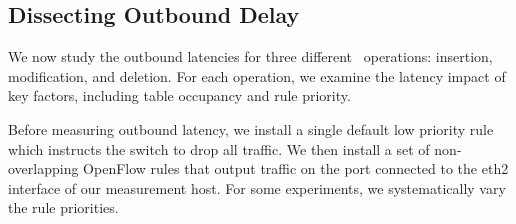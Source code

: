 \subsection{Dissecting Outbound Delay} 
\label{s:outbound_meas}


We now study the outbound latencies for three different \flowmod\
operations: insertion, modification, and deletion. For each operation, we
examine the latency impact of key factors, including table
occupancy and rule priority.

Before measuring outbound latency, we install a single default low priority
rule which instructs the switch to drop all traffic. We then install a set of
non-overlapping OpenFlow rules that
output traffic on the port connected to the
eth2 interface of our measurement host. For some experiments, we 
systematically vary the rule priorities.





